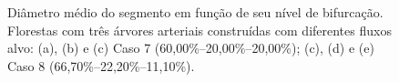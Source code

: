 \begin{figure}[!htb]
  \centering
  \captiondelim{: }
  \caption{Diâmetro médio do segmento em função de seu nível de bifurcação. 
  Florestas com três árvores arteriais construídas com diferentes fluxos alvo: 
  (a), (b) e (c) Caso 7 (60,00\%--20,00\%--20,00\%); (c), (d) e (e) Caso 8 (66,70\%--22,20\%--11,10\%).}
  
  \hspace{12pt}


\end{figure}
